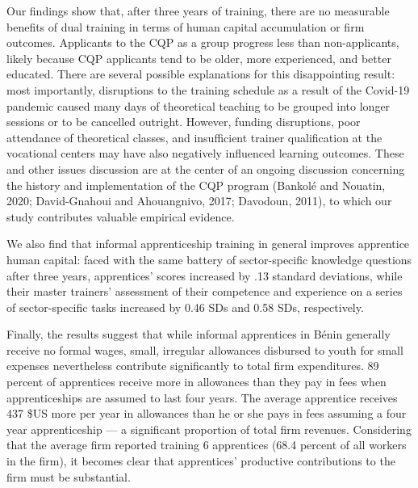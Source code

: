 \documentclass[
  11pt,
a4paper
]{report}
\begin{document}
Our findings show that, after three years of training, there are no measurable benefits of dual training in terms of human capital accumulation or firm outcomes. Applicants to the CQP as a group progress less than non-applicants, likely because CQP applicants tend to be older, more experienced, and better educated. There are several possible explanations for this disappointing result: most importantly, disruptions to the training schedule as a result of the Covid-19 pandemic caused many days of theoretical teaching to be grouped into longer sessions or to be cancelled outright. However, funding disruptions, poor attendance of theoretical classes, and insufficient trainer qualification at the vocational centers may have also negatively influenced learning outcomes. These and other issues discussion are at the center of an ongoing discussion concerning the history and implementation of the CQP program (Bankolé and Nouatin, 2020; David-Gnahoui and Ahouangnivo, 2017; Davodoun, 2011), to which our study contributes valuable empirical evidence.

We also find that informal apprenticeship training in general improves apprentice human capital: faced with the same battery of sector-specific knowledge questions after three years, apprentices' scores increased by .13 standard deviations, while their master trainers' assessment of their competence and experience on a series of sector-specific tasks increased by 0.46 SDs and 0.58 SDs, respectively.

Finally, the results suggest that while informal apprentices in Bénin generally receive no formal wages, small, irregular allowances disbursed to youth for small expenses nevertheless contribute significantly to total firm expenditures. 89 percent of apprentices receive more in allowances than they pay in fees when apprenticeships are assumed to last four years. The average apprentice receives 437 \$US more per year in allowances than he or she pays in fees assuming a four year apprenticeship --- a significant proportion of total firm revenues. Considering that the average firm reported training 6 apprentices (68.4 percent of all workers in the firm), it becomes clear that apprentices' productive contributions to the firm must be substantial.
\end{document}

